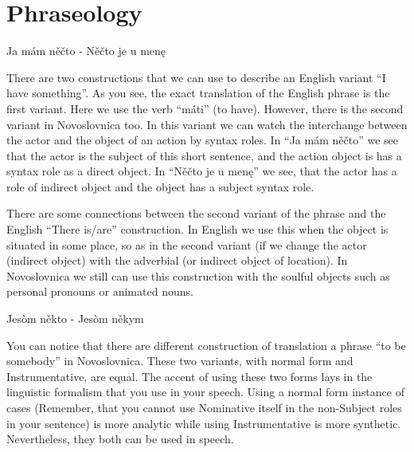 \section{Phraseology}

Ja mám něčto - Něčto je u menę

There are two constructions that we can use to describe an English variant “I have something”.
As you see, the exact translation of the English phrase is the first variant. Here we use the verb “máti” (to have). However, there is the second variant in Novoslovnica too. In this variant we can watch the interchange between the actor and the object of an action by syntax roles. In “Ja mám něčto” we see that the actor is the subject of this short sentence, and the action object is has a syntax role as a direct object. In “Něčto je u menę” we see, that the actor has a role of indirect object and the object has a subject syntax role.    

There are some connections between the second variant of the phrase and the English “There is/are” construction. In English we use this when the object is situated in some place, so as in the second variant (if we change the actor (indirect object) with the adverbial (or indirect object of location). In Novoslovnica we still can use this construction with the soulful objects such as personal pronouns or animated nouns. 

Jesòm někto - Jesòm někym

You can notice that there are different construction of translation a phrase “to be somebody” in Novoslovnica. These two variants, with normal form and Instrumentative, are equal. 
The accent of using these two forms lays in the linguistic formalism that you use in your speech. Using a normal form instance of cases (Remember, that you cannot use Nominative itself in the non-Subject roles in your sentence) is more analytic while using Instrumentative is more synthetic.
Nevertheless, they both can be used in speech.
